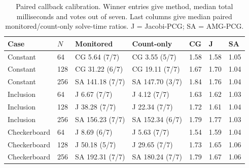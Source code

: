 \begin{table}[htbp]
\centering
\caption{Paired callback calibration. Winner entries give method, median total milliseconds and votes out of seven. Last columns give median paired monitored/count-only solve-time ratios. J = Jacobi-PCG; SA = AMG-PCG.}
\label{tab:protocol}
\small
\begin{tabular}{lllllll}
\toprule
Case & $N$ & Monitored & Count-only & CG & J & SA \\
\midrule
Constant & 64 & CG 5.64 (7/7) & CG 3.55 (5/7) & 1.58 & 1.58 & 1.05 \\
Constant & 128 & CG 31.22 (6/7) & CG 19.11 (7/7) & 1.67 & 1.70 & 1.04 \\
Constant & 256 & SA 141.18 (7/7) & SA 147.70 (3/7) & 1.84 & 1.76 & 1.04 \\
Inclusion & 64 & J 6.67 (7/7) & J 4.12 (7/7) & 1.63 & 1.62 & 1.03 \\
Inclusion & 128 & J 38.28 (7/7) & J 22.34 (7/7) & 1.72 & 1.61 & 1.04 \\
Inclusion & 256 & SA 156.23 (7/7) & SA 152.34 (6/7) & 1.79 & 1.77 & 1.03 \\
Checkerboard & 64 & J 8.69 (6/7) & J 5.63 (7/7) & 1.54 & 1.59 & 1.04 \\
Checkerboard & 128 & J 50.18 (5/7) & J 29.65 (7/7) & 1.73 & 1.65 & 1.06 \\
Checkerboard & 256 & SA 192.31 (7/7) & SA 180.24 (7/7) & 1.79 & 1.67 & 1.06 \\
\bottomrule
\end{tabular}
\end{table}

